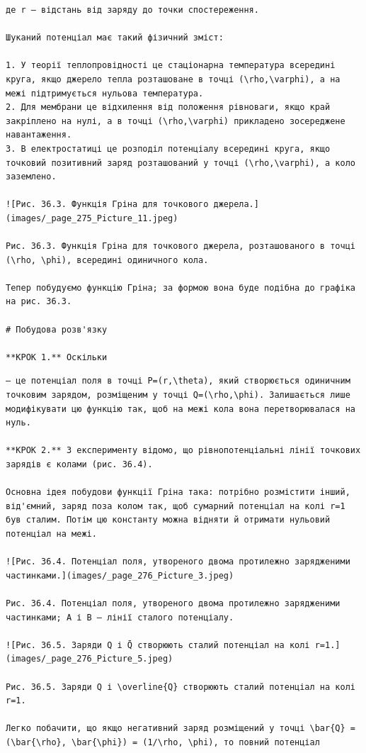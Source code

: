 \documentclass[
  ukrainian,
]{article}
\begin{document}
\begin{verbatim}
де r — відстань від заряду до точки спостереження.

Шуканий потенціал має такий фізичний зміст:

1. У теорії теплопровідності це стаціонарна температура всередині круга, якщо джерело тепла розташоване в точці (\rho,\varphi), а на межі підтримується нульова температура.
2. Для мембрани це відхилення від положення рівноваги, якщо край закріплено на нулі, а в точці (\rho,\varphi) прикладено зосереджене навантаження.
3. В електростатиці це розподіл потенціалу всередині круга, якщо точковий позитивний заряд розташований у точці (\rho,\varphi), а коло заземлено.

![Рис. 36.3. Функція Гріна для точкового джерела.](images/_page_275_Picture_11.jpeg)

Рис. 36.3. Функція Гріна для точкового джерела, розташованого в точці (\rho, \phi), всередині одиничного кола.

Тепер побудуємо функцію Гріна; за формою вона буде подібна до графіка на рис. 36.3.

# Побудова розв'язку

**КРОК 1.** Оскільки
\end{verbatim}

 \ln {}

\begin{verbatim}
— це потенціал поля в точці P=(r,\theta), який створюється одиничним точковим зарядом, розміщеним у точці Q=(\rho,\phi). Залишається лише модифікувати цю функцію так, щоб на межі кола вона перетворювалася на нуль.

**КРОК 2.** З експерименту відомо, що рівнопотенціальні лінії точкових зарядів є колами (рис. 36.4).

Основна ідея побудови функції Гріна така: потрібно розмістити інший, від'ємний, заряд поза колом так, щоб сумарний потенціал на колі r=1 був сталим. Потім цю константу можна відняти й отримати нульовий потенціал на межі.

![Рис. 36.4. Потенціал поля, утвореного двома протилежно зарядженими частинками.](images/_page_276_Picture_3.jpeg)

Рис. 36.4. Потенціал поля, утвореного двома протилежно зарядженими частинками; A і B — лінії сталого потенціалу.

![Рис. 36.5. Заряди Q і Q̄ створюють сталий потенціал на колі r=1.](images/_page_276_Picture_5.jpeg)

Рис. 36.5. Заряди Q і \overline{Q} створюють сталий потенціал на колі r=1.

Легко побачити, що якщо негативний заряд розміщений у точці \bar{Q} = (\bar{\rho}, \bar{\phi}) = (1/\rho, \phi), то повний потенціал
\end{verbatim}
\end{document}
